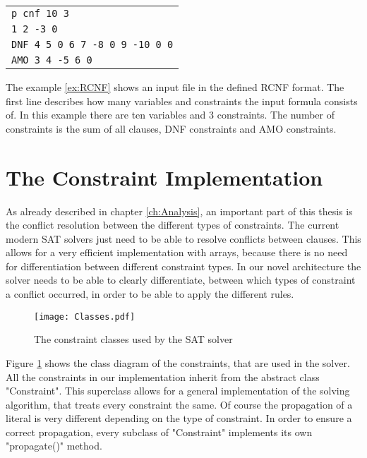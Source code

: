 \begin{center}
\begin{leftbar}
\begin{tabular}{l}
\texttt{p cnf 10 3} \\
\texttt{1 2 -3 0} \\
\texttt{DNF 4 5 0 6 7 -8 0 9 -10 0 0}\\
\texttt{AMO 3 4 -5 6 0} \\
\end{tabular}
\end{leftbar}
\label{ex:RCNF}
\end{center}

The example \ref{ex:RCNF} shows an input file in the defined RCNF format. The first line describes how many variables and constraints the input formula consists of. In this example there are ten variables and 3 constraints. The number of constraints is the sum of all clauses, DNF constraints and AMO constraints.

\section{The Constraint Implementation}

As already described in chapter \ref{ch:Analysis}, an important part of this thesis is the conflict resolution between the different types of constraints. The current modern SAT solvers just need to be able to resolve conflicts between clauses. This allows for a very efficient implementation with arrays, because there is no need for differentiation between different constraint types. In our novel architecture the solver needs to be able to clearly differentiate, between which types of constraint a conflict occurred, in order to be able to apply the different rules.

\begin{figure}[htbp]
  \centering
  \texttt{[image: Classes.pdf]}
  \caption{The constraint classes used by the SAT solver}
  \label{fig:constraints}
\end{figure}

Figure \ref{fig:constraints} shows the class diagram of the constraints, that are used in the solver. All the constraints in our implementation inherit from the abstract class "Constraint". This superclass allows for a general implementation of the solving algorithm, that treats every constraint the same. Of course the propagation of a literal is very different depending on the type of constraint. In order to ensure a correct propagation, every subclass of "Constraint" implements its own "propagate()" method.

